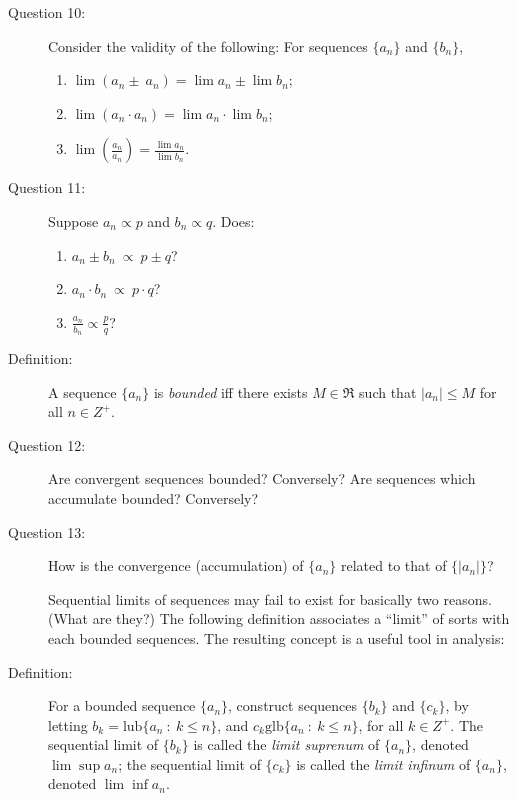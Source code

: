 \documentclass{article}
\begin{document}
\begin{description}
  \item[Question 10:] Consider the validity of the following: For sequences $\{ a_n \}$ and $\{b_n\}$,
    \begin{enumerate}[\hspace{1cm}(1)]
      \item $\lim (a_n \pm\ a_n) = \lim a_n \pm  \lim b_n $;
      \item $\lim (a_n \cdot a_n) = \lim a_n \cdot  \lim b_n $;
      \item $\lim \left( \frac{a_n}{a_n} \right) = \frac{\lim a_n}{\lim b_n}$.
    \end{enumerate}

  \item[Question 11:] Suppose $a_n \propto p$ and $b_n \propto q$. Does:
    \begin{enumerate}[\hspace{1cm}(1)]
      \item $a_n \pm b_n\ \propto\ p \pm q$?
      \item $a_n \cdot b_n\ \propto\ p \cdot q$?
      \item $\frac{a_n}{b_n} \propto \frac{p}{q}$?
    \end{enumerate}

  \item[Definition:] A sequence $\{ a_n \}$ is \emph{bounded} iff there exists $M \in \Re$ such that $|a_n| \leqslant M$ for all $n \in Z^+$.

  \item[Question 12:] Are convergent sequences bounded? Conversely? Are sequences which accumulate bounded? Conversely?

  \item[Question 13:] How is the convergence (accumulation) of $\{ a_n \}$ related to that of $\{|a_n|\}$?

  \item[] Sequential limits of sequences may fail to exist for basically two reasons. (What are they?) The following definition associates a ``limit'' of sorts with each bounded sequences. The resulting concept is a useful tool in analysis:

  \item[Definition:] For a bounded sequence $\{ a_n \}$, construct sequences $\{ b_k \}$ and $\{ c_k \}$, by letting $b_k = \text{lub} \{ a_n\ :\ k \leq n \}$, and $c_k \text{glb} \{ a_n\ :\ k \leq n \}$, for all $k \in Z^+$. The sequential limit of $\{ b_k \}$ is called the \emph{limit suprenum} of $\{ a_n \}$, denoted $\lim \sup a_n$; the sequential limit of $\{ c_k \}$ is called the \emph{limit infinum} of $\{ a_n \}$, denoted $\lim \inf a_n$.


\end{description}
\end{document}
